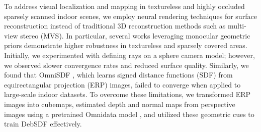 To address visual localization and mapping in textureless and highly occluded sparsely scanned indoor scenes, we employ neural rendering techniques for surface reconstruction instead of traditional 3D reconstruction methods such as multi-view stereo (MVS).
In particular, several works leveraging monocular geometric priors \cite{yu2022monosdf, xiao2024debsdf} demonstrate higher robustness in textureless and sparsely covered areas.
Initially, we experimented with defining rays on a sphere camera model; however, we observed slower convergence rates and reduced surface quality.
Similarly, we found that OmniSDF \cite{kim2024omnisdf}, which learns signed distance functions (SDF) from equirectangular projection (ERP) images, failed to converge when applied to large-scale indoor datasets.
To overcome these limitations, we transformed ERP images into cubemaps, estimated depth and normal maps from perspective images using a pretrained Omnidata model \cite{eftekhar2021omnidata}, and utilized these geometric cues to train DebSDF \cite{xiao2024debsdf} effectively.

